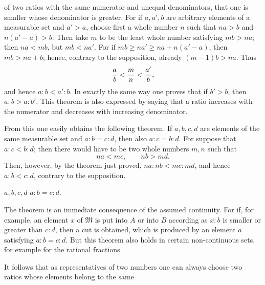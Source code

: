 of two ratios with the same numerator and unequal denominators, that
one is smaller whose denominator is greater. For if $a,a',b$ are
arbitrary elements of a measurable set and $a'>a$, choose first a whole
number $n$ such that $na>b$ and $n(a'-a)>b$. Then take $m$ to be the
least whole number satisfying $mb>na$; then $na<mb$, but $mb<na'$.
For if $mb\ge na'\ge na+n(a'-a)$, then $mb>na+b$; hence, contrary to
the supposition, already $(m-1)b>na$. Thus
\[
 {a\over b}<{m\over n}<{a'\over b},
\]
and hence $a:b<a':b$. In exactly the same way one proves that if
$b'>b$, then $a:b>a:b'$. This theorem is also expressed by saying that
a ratio increases with the numerator and decreases with increasing
denominator.

From this one easily obtains the following theorem. If $a,b,c,d$ are
elements of the same measurable set and $a:b=c:d$, then also
$a:c=b:d$. For suppose that $a:c<b:d$; then there would have to be two
whole numbers $m,n$ such that
\[
 na<mc,
 \qquad nb>md.
\]
Then, however, by the theorem just proved, $na:nb<mc:md$, and hence
$a:b<c:d$, contrary to the supposition.

 $a,b,c,d$  $a:b=c:d$.

The theorem is an immediate consequence of the assumed continuity. For
if, for example, an element $x$ of $\mathfrak M$ is put into $A$ or
into $B$ according as $x:b$ is smaller or greater than $c:d$, then a
cut is obtained, which is produced by an element $a$ satisfying
$a:b=c:d$. But this theorem also holds in certain non-continuous sets,
for example for the rational fractions.

It follows that as representatives of two numbers one can always
choose two ratios whose elements belong to the same
